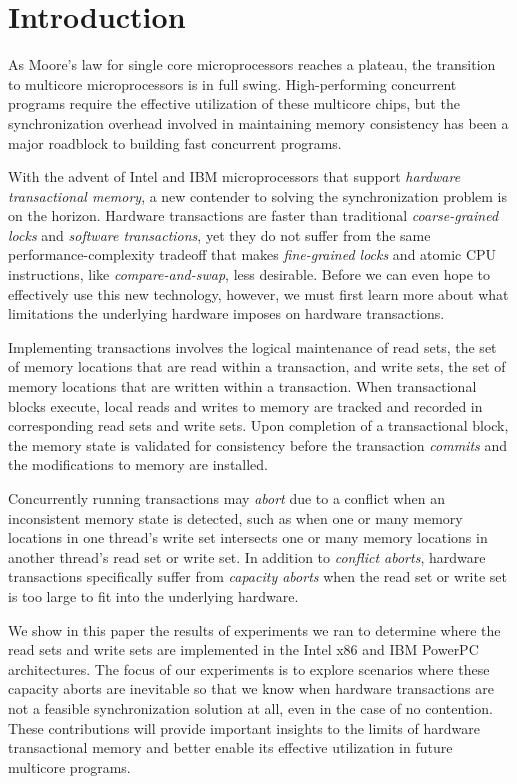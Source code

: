 \section{Introduction}
As Moore's law for single core microprocessors reaches a plateau, the transition
to multicore microprocessors is in full swing. High-performing concurrent
programs require the effective utilization of these multicore chips, but the
synchronization overhead involved in maintaining memory consistency has been a
major roadblock to building fast concurrent programs.

With the advent of Intel and IBM microprocessors that support \textit{hardware
transactional memory}, a new contender to solving the synchronization problem is
on the horizon. Hardware transactions are faster than traditional
\textit{coarse-grained locks} and \textit{software transactions}, yet they do
not suffer from the same performance-complexity tradeoff that makes
\textit{fine-grained locks} and atomic CPU instructions, like
\textit{compare-and-swap}, less desirable. Before we can even hope to
effectively use this new technology, however, we must first learn more about
what limitations the underlying hardware imposes on hardware transactions.

Implementing transactions involves the logical maintenance of read sets, the set
of memory locations that are read within a transaction, and write sets, the set
of memory locations that are written within a transaction. When transactional
blocks execute, local reads and writes to memory are tracked and recorded in
corresponding read sets and write sets. Upon completion of a transactional
block, the memory state is validated for consistency before the transaction
\textit{commits} and the modifications to memory are installed.

Concurrently running transactions may \textit{abort} due to a conflict when an
inconsistent memory state is detected, such as when one or many memory locations
in one thread's write set intersects one or many memory locations in another
thread's read set or write set. In addition to \textit{conflict aborts},
hardware transactions specifically suffer from \textit{capacity aborts} when the
read set or write set is too large to fit into the underlying hardware.

We show in this paper the results of experiments we ran to determine where the
read sets and write sets are implemented in the Intel x86 and IBM PowerPC
architectures. The focus of our experiments is to explore scenarios where these
capacity aborts are inevitable so that we know when hardware transactions are
not a feasible synchronization solution at all, even in the case of no
contention. These contributions will provide important insights to the limits of
hardware transactional memory and better enable its effective utilization in
future multicore programs.
 
